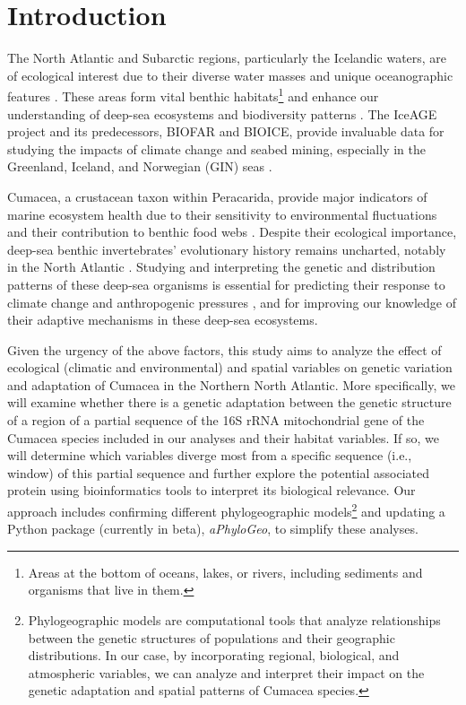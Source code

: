 \section{Introduction}\label{introduction}
The North Atlantic and Subarctic regions, particularly the Icelandic waters, are of ecological interest due to their diverse water masses and unique oceanographic features \citep{schnurr_composition_2014, meisner_benthic_2014, uhlir_adding_2021}. These areas form vital {benthic habitats}\footnote{Areas at the bottom of oceans, lakes, or rivers, including sediments and organisms that live in them.} \citep{levin2009ecological} and enhance our understanding of deep-sea ecosystems and biodiversity patterns \citep{rogers2007corals, danovaro2008exponential, uhlir_adding_2021}. The IceAGE project and its predecessors, BIOFAR and BIOICE, provide invaluable data for studying the impacts of climate change and seabed mining, especially in the Greenland, Iceland, and Norwegian (GIN) seas \citep{meisner_prefacebiodiversity_2018}.

Cumacea, a crustacean taxon within Peracarida, provide major indicators of marine ecosystem health due to their sensitivity to environmental fluctuations \citep{stransky_diversity_2010} and their contribution to benthic food webs \citep{rehm2009cumacea}. Despite their ecological importance, deep-sea benthic invertebrates’ evolutionary history remains uncharted, notably in the North Atlantic \citep{jennings_phylogeographic_2014}. Studying and interpreting the genetic and distribution patterns of these deep-sea organisms is essential for predicting their response to climate change \citep{jennings_phylogeographic_2014} and anthropogenic pressures \citep{meisner_prefacebiodiversity_2018}, and for improving our knowledge of their adaptive mechanisms in these deep-sea ecosystems.

Given the urgency of the above factors, this study aims to analyze the effect of ecological (climatic and environmental) and spatial variables on genetic variation and adaptation of Cumacea in the Northern North Atlantic. More specifically, we will examine whether there is a genetic adaptation between the genetic structure of a region of a partial sequence of the 16S rRNA mitochondrial gene of the Cumacea species included in our analyses and their habitat variables. If so, we will determine which variables diverge most from a specific sequence (i.e., window) of this partial sequence and further explore the potential associated protein using bioinformatics tools to interpret its biological relevance. Our approach includes confirming different {phylogeographic models}\footnote{Phylogeographic models are computational tools that analyze relationships between the genetic structures of populations and their geographic distributions. In our case, by incorporating regional, biological, and atmospheric variables, we can analyze and interpret their impact on the genetic adaptation and spatial patterns of Cumacea species.} and updating a Python package (currently in beta), \textit{aPhyloGeo}, to simplify these analyses.

